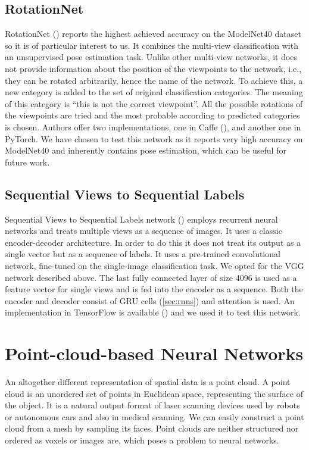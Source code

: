

\subsection{RotationNet}
RotationNet (\cite{kanezaki_rotationnet:_2018}) reports the highest achieved accuracy on the ModelNet40 dataset so it is of particular interest to us. It combines the multi-view classification with an unsupervised pose estimation task. Unlike other multi-view networks, it does not provide information about the position of the viewpoints to the network, i.e., they can be rotated arbitrarily, hence the name of the network. 
To achieve this, a new category is added to the set of original classification categories. The meaning of this category is “this is not the correct viewpoint”. All the possible rotations of the viewpoints are tried and the most probable according to predicted categories is chosen. Authors offer two implementations, one in Caffe (\cite{kanezaki_rotationnet_2018}), and another one in PyTorch. We have chosen to test this network as it reports very high accuracy on ModelNet40 and inherently contains pose estimation, which can be useful for future work.

\subsection{Sequential Views to Sequential Labels}
Sequential Views to Sequential Labels network (\cite{zhizhong_seqviews2seqlabels:_2018}) employs recurrent neural networks and treats multiple views as a sequence of images. It uses a classic encoder-decoder architecture. In order to do this it does not treat its output as a single vector but as a sequence of labels. It uses a pre-trained convolutional network, fine-tuned on the single-image classification task. We opted for the VGG network described above. The last fully connected layer of size 4096 is used as a feature vector for single views and is fed into the encoder as a sequence. Both the encoder and decoder consist of GRU cells (\autoref{sec:rnns}) and attention is used. An implementation in TensorFlow is available (\cite{zhizhong_seq2seq_2018}) and we used it to test this network.

\section{Point-cloud-based Neural Networks}
An altogether different representation of spatial data is a point cloud. A point cloud is an unordered set of points in Euclidean space, representing the surface of the object. It is a natural output format of laser scanning devices used by robots or autonomous cars and also in medical scanning. We can easily construct a point cloud from a mesh by sampling its faces. Point clouds are neither structured nor ordered as voxels or images are, which poses a problem to neural networks.

